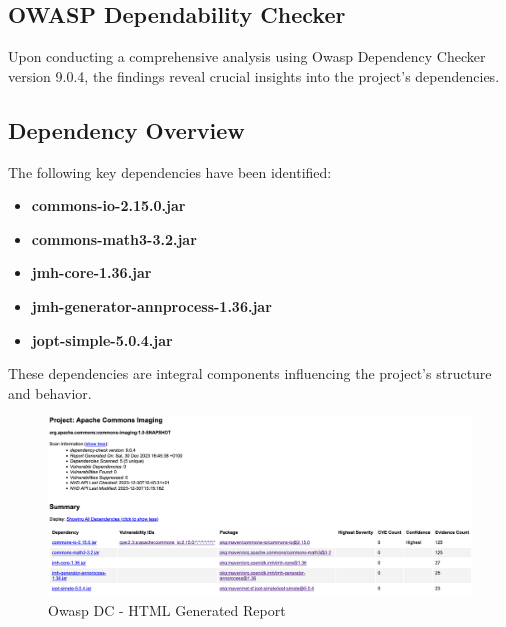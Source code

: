 \documentclass[sigconf]{acmart}
\begin{document}
\subsection{OWASP Dependability Checker}
Upon conducting a comprehensive analysis using Owasp Dependency Checker\cite{owasp-dependency-check} version 9.0.4, the findings reveal crucial insights into the project's dependencies.

\subsection{Dependency Overview}

The following key dependencies have been identified:

\begin{itemize}
    \item \textbf{commons-io-2.15.0.jar}
    \item \textbf{commons-math3-3.2.jar}
    \item \textbf{jmh-core-1.36.jar}
    \item \textbf{jmh-generator-annprocess-1.36.jar}
    \item \textbf{jopt-simple-5.0.4.jar}
\end{itemize}

These dependencies are integral components influencing the project's structure and behavior.


\begin{figure}[h!]
    \centering
    \includegraphics[width=1\linewidth,height=0.7\linewidth]{reportOwaspDC.png}
    \caption{Owasp DC - HTML Generated Report}
    \label{fig:enter-label}
\end{figure}
\end{document}
